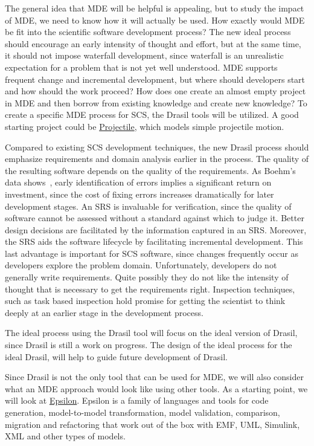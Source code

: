 \documentclass[12pt]{article}
\begin{document}
The general idea that MDE will be helpful is appealing, but to study the impact
of MDE, we need to know how it will actually be used.  How exactly would MDE be
fit into the scientific software development process?  The new ideal process
should encourage an early intensity of thought and effort, but at the same time,
it should not impose waterfall development, since waterfall is an unrealistic
expectation for a problem that is not yet well understood.  MDE supports
frequent change and incremental development, but where should developers start
and how should the work proceed?  How does one create an almost empty project in
MDE and then borrow from existing knowledge and create new knowledge?  To create
a specific MDE process for SCS, the Drasil tools will be utilized.  A good
starting project could be
\href{https://jacquescarette.github.io/Drasil/examples/Projectile/srs/Projectile_SRS.html}
{Projectile}, which models simple projectile motion.

Compared to existing SCS development techniques, the new Drasil process should
emphasize requirements and domain analysis earlier in the process.  The quality
of the resulting software depends on the quality of the requirements.  As
Boehm's data shows~\cite{Boehm1981}, early identification of errors implies a
significant return on investment, since the cost of fixing errors increases
dramatically for later development stages.  An SRS is invaluable for
verification, since the quality of software cannot be assessed without a
standard against which to judge it. Better design decisions are facilitated by
the information captured in an SRS.  Moreover, the SRS aids the software
lifecycle by facilitating incremental development.  This last advantage is
important for SCS software, since changes frequently occur as developers explore
the problem domain.  Unfortunately, developers do not generally write
requirements.  Quite possibly they do not like the intensity of thought that is
necessary to get the requirements right.  Inspection techniques, such as task
based inspection \citep{KellyAndShepard2000, KellyAndShepard2004} hold promise
for getting the scientist to think deeply at an earlier stage in the development
process.

The ideal process using the Drasil tool will focus on the ideal version of
Drasil, since Drasil is still a work on progress.  The design of the ideal
process for the ideal Drasil, will help to guide future development of Drasil.

Since Drasil is not the only tool that can be used for MDE, we will also
consider what an MDE approach would look like using other tools.  As a starting
point, we will look at \href{https://www.eclipse.org/epsilon/}{Epsilon}.
Epsilon is a family of languages and tools for code generation, model-to-model
transformation, model validation, comparison, migration and refactoring that
work out of the box with EMF, UML, Simulink, XML and other types of models.
\end{document}
